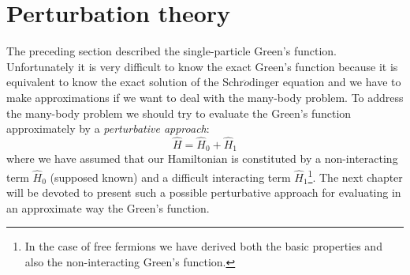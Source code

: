 \documentclass[../main/main.tex]{subfiles}
\begin{document}
\chapter{Perturbation theory}

The preceding section described the single-particle Green's function. Unfortunately it is very difficult to know the exact Green's function because it is equivalent to know the exact solution of the Schr$\ddot{o}$dinger equation and we have to make approximations if we want to deal with the many-body problem.
To address the many-body problem we should try to evaluate the Green's function approximately by a \emph{perturbative approach}:
\begin{equation*}
  \hat{H} = \hat{H}_0 + \hat{H}_1
\end{equation*}
where we have assumed that our Hamiltonian is constituted by a non-interacting term \( \hat{H}_0  \) (supposed known) and a difficult interacting term \( \hat{H}_1  \)\footnote{In the case of free fermions we have derived both the basic properties and also the non-interacting Green's function.}. The next chapter will be devoted to present such a possible perturbative approach for evaluating in an approximate way the Green's function.
\end{document}
